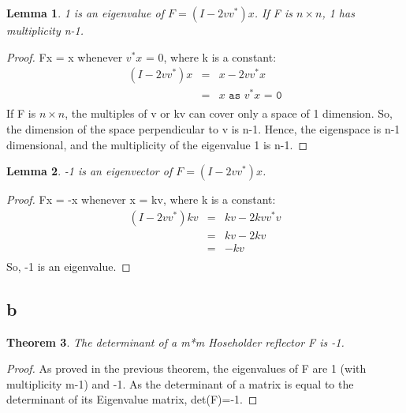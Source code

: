 \documentclass[10pt]{amsart}
\newtheorem{thm}{Theorem}[subsection]
\newtheorem{lem}[thm]{Lemma}
\theoremstyle{remark}
\begin{document}
\begin{lem}
 1 is an eigenvalue of $F = (I-2vv^{*})x$. If F is $n\times n$, 1 has multiplicity n-1.
\end{lem}
\begin{proof}
Fx = x whenever $v^{*}x$ = 0, where k is a constant:
\begin{eqnarray} 
(I-2vv^{*})x &=& x -2vv^{*}x\\
&=& x \texttt{ as $v^{*}x$ = 0}\\
\end{eqnarray}
If F is $n\times n$, the multiples of v or kv can cover only a space of 1 dimension. So, the dimension of the space perpendicular to v is n-1. Hence, the eigenspace is n-1 dimensional, and the multiplicity of the eigenvalue 1 is n-1.
\end{proof}

\begin{lem}
 -1 is an eigenvector of $F = (I-2vv^{*})x$.
\end{lem}
\begin{proof}
Fx = -x whenever x = kv, where k is a constant:
\begin{eqnarray} 
(I-2vv^{*})kv &=& kv -2kvv^{*}v\\
&=& kv -2kv\\
&=& -kv\\
\end{eqnarray}
So, -1 is an eigenvalue.
\end{proof}


\subsection{b}
\begin{thm}
 The determinant of a m*m Hoseholder reflector F is -1.
\end{thm}
\begin{proof}
 As proved in the previous theorem, the eigenvalues of F are 1 (with multiplicity m-1) and -1. As the determinant of a matrix is equal to the determinant of its Eigenvalue matrix, det(F)=-1.
\end{proof}
\end{document}
